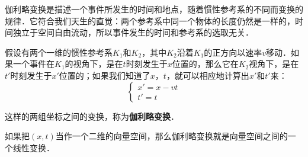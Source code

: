 


伽利略变换是描述一个事件所发生的时间和地点，随着惯性参考系的不同而变换的规律．它符合我们天生的直觉：两个参考系中同一个物体的长度仍然是一样的，时间独立于空间自由流动，所以事件发生的时间和参考系的选取无关．

假设有两个一维的惯性参考系$K_1$和$K_2$，其中$K_2$沿着$K_1$的正方向以速率$v$移动．如果一个事件在$K_1$的视角下，是在$t$时刻发生于$x$位置的，那么它在$K_2$视角下，是在$t'$时刻发生于$x'$位置的；如果我们知道了$x$，$t$，就可以相应地计算出$x'$和$t'$来：
\begin{equation}
\begin{cases}
x' = x - vt\\
t' = t
\end{cases}
\end{equation}

这样的两组坐标之间的变换，称为\textbf{伽利略变换}．

如果把$(x, t)$当作一个二维的向量空间，那么伽利略变换就是向量空间之间的一个线性变换．
